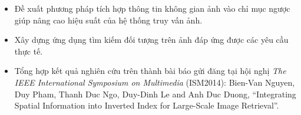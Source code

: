 \begin{contributions}         

\begin{itemize}

\item Đề xuất phương pháp tích hợp thông tin không gian ảnh vào chỉ mục ngược giúp nâng cao hiệu suất của hệ thống truy vấn ảnh.

\item Xây dựng ứng dụng tìm kiếm đối tượng trên ảnh đáp ứng được các yêu cầu thực tế.

\item Tổng hợp kết quả nghiên cứu trên thành bài báo gửi đăng tại hội nghị \textit{The IEEE International Symposium on Multimedia} (ISM2014):  Bien-Van Nguyen, Duy Pham, Thanh Duc Ngo, Duy-Dinh Le and Anh Duc Duong, ``Integrating Spatial Information into Inverted Index for Large-Scale Image Retrieval''.

\end{itemize}

\end{contributions}
 